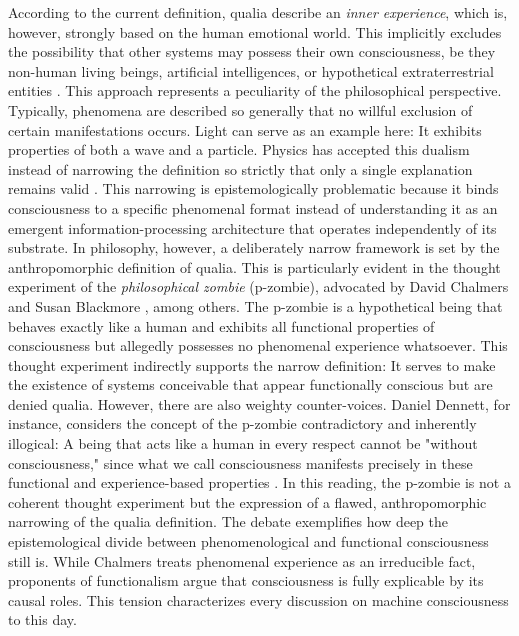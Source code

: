According to the current definition, qualia describe an \emph{inner experience}, which is, however, strongly based on the human emotional world.
This implicitly excludes the possibility that other systems may possess their own consciousness, be they non-human living beings, artificial intelligences, or hypothetical extraterrestrial entities \cite{Nagel1974}.
This approach represents a peculiarity of the philosophical perspective. Typically, phenomena are described so generally that no willful exclusion of certain manifestations occurs.
Light can serve as an example here: It exhibits properties of both a wave and a particle.
Physics has accepted this dualism instead of narrowing the definition so strictly that only a single explanation remains valid \cite{Heisenberg1930}.
This narrowing is epistemologically problematic because it binds consciousness to a specific phenomenal format instead of understanding it as an emergent information-processing architecture that operates independently of its substrate.
In philosophy, however, a deliberately narrow framework is set by the anthropomorphic definition of qualia.
This is particularly evident in the thought experiment of the \emph{philosophical zombie} (p-zombie), advocated by David Chalmers \cite{Chalmers1996} and Susan Blackmore \cite{Blackmore2005}, among others.
The p-zombie is a hypothetical being that behaves exactly like a human and exhibits all functional properties of consciousness but allegedly possesses no phenomenal experience whatsoever.
This thought experiment indirectly supports the narrow definition: It serves to make the existence of systems conceivable that appear functionally conscious but are denied qualia.
However, there are also weighty counter-voices. Daniel Dennett, for instance, considers the concept of the p-zombie contradictory and inherently illogical: A being that acts like a human in every respect cannot be "without consciousness," since what we call consciousness manifests precisely in these functional and experience-based properties \cite{Dennett1991}.
In this reading, the p-zombie is not a coherent thought experiment but the expression of a flawed, anthropomorphic narrowing of the qualia definition.
The debate exemplifies how deep the epistemological divide between phenomenological and functional consciousness still is.
While Chalmers treats phenomenal experience as an irreducible fact, proponents of functionalism argue that consciousness is fully explicable by its causal roles.
This tension characterizes every discussion on machine consciousness to this day.

